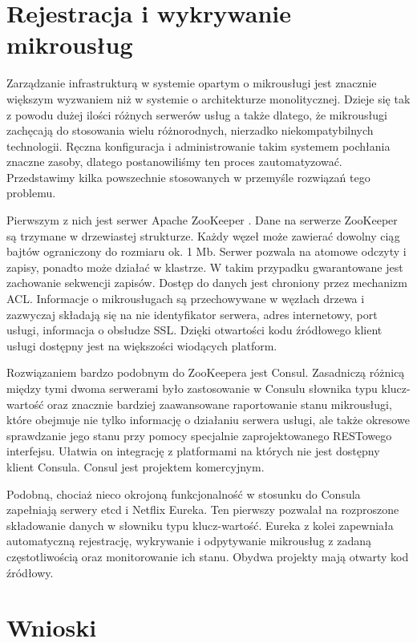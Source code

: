 \documentclass[licencjacka]{pracamgr}
\begin{document}
\section{Rejestracja i wykrywanie mikrousług}

Zarządzanie infrastrukturą w systemie opartym o mikrousługi jest znacznie większym
wyzwaniem niż w systemie o architekturze monolitycznej. Dzieje się tak z powodu
dużej ilości różnych serwerów usług a także dlatego, że mikrousługi zachęcają do
stosowania wielu różnorodnych, nierzadko niekompatybilnych technologii. Ręczna
konfiguracja i administrowanie takim systemem pochłania znaczne zasoby, dlatego
postanowiliśmy ten proces zautomatyzować. Przedstawimy kilka powszechnie stosowanych
w przemyśle rozwiązań tego problemu.

Pierwszym z nich jest serwer Apache ZooKeeper \cite{zookeeper}. Dane na serwerze
ZooKeeper są trzymane w drzewiastej strukturze. Każdy węzeł może zawierać dowolny
ciąg bajtów ograniczony do rozmiaru ok. 1 Mb. Serwer pozwala na atomowe odczyty i
zapisy, ponadto może działać w klastrze. W takim przypadku gwarantowane jest zachowanie
sekwencji zapisów. Dostęp do danych jest chroniony przez mechanizm ACL.
Informacje o mikrousługach są przechowywane w węzłach drzewa i zazwyczaj składają
się na nie identyfikator serwera, adres internetowy, port usługi, informacja o
obsłudze SSL. Dzięki otwartości kodu źródłowego klient usługi dostępny jest na
większości wiodących platform.

Rozwiązaniem bardzo podobnym do ZooKeepera jest Consul. Zasadniczą różnicą
między tymi dwoma serwerami było zastosowanie w Consulu słownika typu
klucz-wartość oraz znacznie bardziej zaawansowane raportowanie stanu
mikrousługi, które obejmuje nie tylko informację o działaniu serwera usługi,
ale także okresowe sprawdzanie jego stanu przy pomocy specjalnie
zaprojektowanego RESTowego interfejsu. Ułatwia on integrację z platformami na
których nie jest dostępny klient Consula. Consul jest projektem komercyjnym.

Podobną, chociaż nieco okrojoną funkcjonalność w stosunku do Consula zapełniają
serwery etcd i Netflix Eureka. Ten pierwszy pozwalał na rozproszone składowanie
danych w słowniku typu klucz-wartość. Eureka z kolei zapewniała automatyczną
rejestrację, wykrywanie i odpytywanie mikrousług z zadaną częstotliwością oraz
monitorowanie ich stanu. Obydwa projekty mają otwarty kod źródłowy.

\section{Wnioski}
\end{document}
